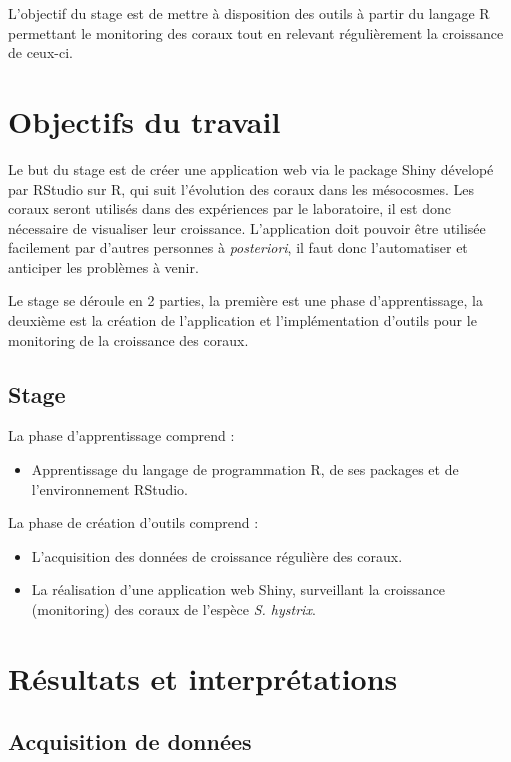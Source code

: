 \documentclass[]{report}
\providecommand{\tightlist}{%
  \setlength{\itemsep}{0pt}\setlength{\parskip}{0pt}}
\begin{document}
L'objectif du stage est de mettre à disposition des outils à partir du
langage R permettant le monitoring des coraux tout en relevant
régulièrement la croissance de ceux-ci.

\chapter{Objectifs du travail}\label{objectifs-du-travail}

Le but du stage est de créer une application web via le package Shiny
dévelopé par RStudio sur R, qui suit l'évolution des coraux dans les
mésocosmes. Les coraux seront utilisés dans des expériences par le
laboratoire, il est donc nécessaire de visualiser leur croissance.
L'application doit pouvoir être utilisée facilement par d'autres
personnes à \emph{posteriori}, il faut donc l'automatiser et anticiper
les problèmes à venir.

Le stage se déroule en 2 parties, la première est une phase
d'apprentissage, la deuxième est la création de l'application et
l'implémentation d'outils pour le monitoring de la croissance des
coraux.

\section{Stage}\label{stage}

La phase d'apprentissage comprend :

\begin{itemize}
\tightlist
\item
  Apprentissage du langage de programmation R, de ses packages et de
  l'environnement RStudio.
\end{itemize}

La phase de création d'outils comprend :

\begin{itemize}
\item
  L'acquisition des données de croissance régulière des coraux.
\item
  La réalisation d'une application web Shiny, surveillant la croissance
  (monitoring) des coraux de l'espèce \emph{S. hystrix}.
\end{itemize}

\chapter{Résultats et
interprétations}\label{resultats-et-interpretations}

\section{Acquisition de données}\label{acquisition-de-donnees}
\end{document}

